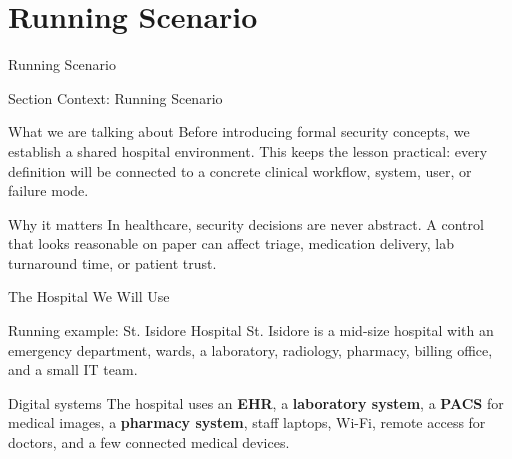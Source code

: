 \documentclass[presentation]{beamer}
\newcommand{\sectiontitleframe}[1]{
\begin{frame}[plain,c]
\begin{center}
{\usebeamerfont{title}\usebeamercolor[fg]{title}#1}
\end{center}
\end{frame}
}
\begin{document}
\section{Running Scenario}
\sectiontitleframe{Running Scenario}

\begin{frame}[c]{Section Context: Running Scenario}
\begin{block}{What we are talking about}
Before introducing formal security concepts, we establish a shared hospital environment. This
keeps the lesson practical: every definition will be connected to a concrete clinical workflow,
system, user, or failure mode.
\end{block}

\begin{exampleblock}{Why it matters}
In healthcare, security decisions are never abstract. A control that looks reasonable on paper can
affect triage, medication delivery, lab turnaround time, or patient trust.
\end{exampleblock}
\end{frame}

\begin{frame}[c]{The Hospital We Will Use}
\begin{block}{Running example: St. Isidore Hospital}
St. Isidore is a mid-size hospital with an emergency department, wards, a laboratory,
radiology, pharmacy, billing office, and a small IT team.
\end{block}

\begin{exampleblock}{Digital systems}
The hospital uses an \textbf{EHR}, a \textbf{laboratory system}, a \textbf{PACS} for medical images,
a \textbf{pharmacy system}, staff laptops, Wi-Fi, remote access for doctors, and a few connected
medical devices.
\end{exampleblock}
\end{frame}
\end{document}
